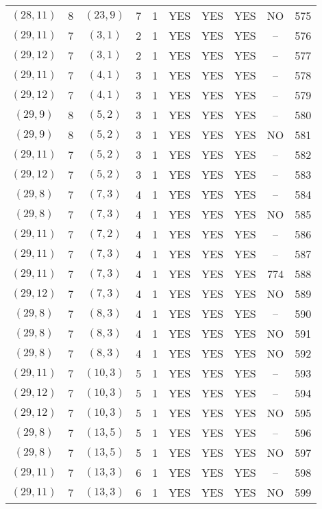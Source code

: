 \begin{longtable}{|c|c|c|c|c|c|c|c|c|c|}
$(28, 11)$ & 8 & $(23, 9)$ & 7 & 1 & YES & YES & YES & NO & 575\\
$(29, 11)$ & 7 & $(3, 1)$ & 2 & 1 & YES & YES & YES & -- & 576\\
$(29, 12)$ & 7 & $(3, 1)$ & 2 & 1 & YES & YES & YES & -- & 577\\
$(29, 11)$ & 7 & $(4, 1)$ & 3 & 1 & YES & YES & YES & -- & 578\\
$(29, 12)$ & 7 & $(4, 1)$ & 3 & 1 & YES & YES & YES & -- & 579\\
$(29, 9)$ & 8 & $(5, 2)$ & 3 & 1 & YES & YES & YES & -- & 580\\
$(29, 9)$ & 8 & $(5, 2)$ & 3 & 1 & YES & YES & YES & NO & 581\\
$(29, 11)$ & 7 & $(5, 2)$ & 3 & 1 & YES & YES & YES & -- & 582\\
$(29, 12)$ & 7 & $(5, 2)$ & 3 & 1 & YES & YES & YES & -- & 583\\
$(29, 8)$ & 7 & $(7, 3)$ & 4 & 1 & YES & YES & YES & -- & 584\\
$(29, 8)$ & 7 & $(7, 3)$ & 4 & 1 & YES & YES & YES & NO & 585\\
$(29, 11)$ & 7 & $(7, 2)$ & 4 & 1 & YES & YES & YES & -- & 586\\
$(29, 11)$ & 7 & $(7, 3)$ & 4 & 1 & YES & YES & YES & -- & 587\\
$(29, 11)$ & 7 & $(7, 3)$ & 4 & 1 & YES & YES & YES & 774 & 588\\
$(29, 12)$ & 7 & $(7, 3)$ & 4 & 1 & YES & YES & YES & NO & 589\\
$(29, 8)$ & 7 & $(8, 3)$ & 4 & 1 & YES & YES & YES & -- & 590\\
$(29, 8)$ & 7 & $(8, 3)$ & 4 & 1 & YES & YES & YES & NO & 591\\
$(29, 8)$ & 7 & $(8, 3)$ & 4 & 1 & YES & YES & YES & NO & 592\\
$(29, 11)$ & 7 & $(10, 3)$ & 5 & 1 & YES & YES & YES & -- & 593\\
$(29, 12)$ & 7 & $(10, 3)$ & 5 & 1 & YES & YES & YES & -- & 594\\
$(29, 12)$ & 7 & $(10, 3)$ & 5 & 1 & YES & YES & YES & NO & 595\\
$(29, 8)$ & 7 & $(13, 5)$ & 5 & 1 & YES & YES & YES & -- & 596\\
$(29, 8)$ & 7 & $(13, 5)$ & 5 & 1 & YES & YES & YES & NO & 597\\
$(29, 11)$ & 7 & $(13, 3)$ & 6 & 1 & YES & YES & YES & -- & 598\\
$(29, 11)$ & 7 & $(13, 3)$ & 6 & 1 & YES & YES & YES & NO & 599\\

\end{longtable}
